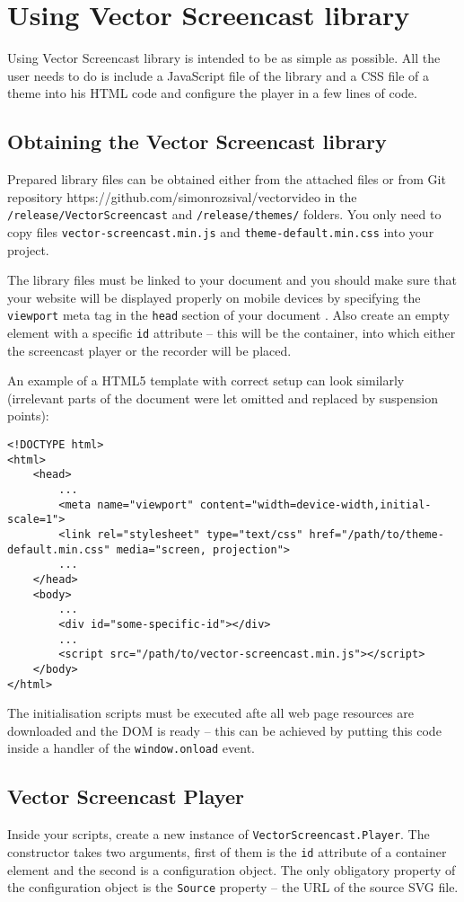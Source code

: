 \chapter{Using Vector Screencast library}
\label{ch:integration}

Using Vector Screencast library is intended to be as simple as possible. All the user needs to do is include a JavaScript file of the library and a CSS file of a theme into his HTML code and configure the player in a few lines of code.

\section{Obtaining the Vector Screencast library}
Prepared library files can be obtained either from the attached files or from Git repository https://github.com/simonrozsival/vectorvideo in the \verb|/release/VectorScreencast| and \verb|/release/themes/| folders. You only need to copy files \verb|vector-screencast.min.js| and \verb|theme-default.min.css| into your project.

The library files must be linked to your document and you should make sure that your website will be displayed properly on mobile devices by specifying the \verb|viewport| meta tag in the \verb|head| section of your document \cite{html_viewport}. Also create an empty element with a specific \verb|id| attribute -- this will be the container, into which either the screencast player or the recorder will be placed.

An example of a HTML5 template with correct setup can look similarly (irrelevant parts of the document were let omitted and replaced by suspension points):

\begin{lstlisting}
<!DOCTYPE html>
<html>
	<head>
		...
		<meta name="viewport" content="width=device-width,initial-scale=1">
		<link rel="stylesheet" type="text/css" href="/path/to/theme-default.min.css" media="screen, projection">
		...
	</head>
	<body>
		...
		<div id="some-specific-id"></div>
		...
		<script src="/path/to/vector-screencast.min.js"></script>
	</body>
</html>
\end{lstlisting}

The initialisation scripts must be executed afte all web page resources are downloaded and the DOM is ready -- this can be achieved by putting this code inside a handler of the \verb|window.onload| event.

\section{Vector Screencast Player}
Inside your scripts, create a new instance of \verb|VectorScreencast.Player|. The constructor takes two arguments, first of them is the \verb|id| attribute of a container element and the second is a configuration object. The only obligatory property of the configuration object is the \verb|Source| property -- the URL of the source SVG file. 

